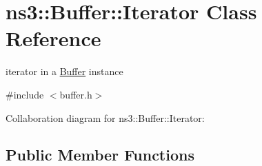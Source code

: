 \hypertarget{classns3_1_1Buffer_1_1Iterator}{}\section{ns3\+:\+:Buffer\+:\+:Iterator Class Reference}
\label{classns3_1_1Buffer_1_1Iterator}


iterator in a \hyperlink{classns3_1_1Buffer}{Buffer} instance  




{\ttfamily \#include $<$buffer.\+h$>$}



Collaboration diagram for ns3\+:\+:Buffer\+:\+:Iterator\+:
\subsection*{Public Member Functions}
